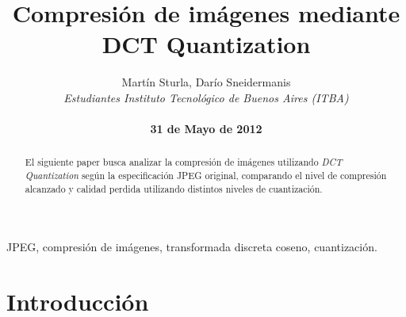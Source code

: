\documentclass[%
	final,
	reprint,
	notitlepage,
	narroweqnarray,
	inline,
	twoside,
	invited
	]{ieee}
\begin{document}
\title[Compresión de Imágenes]{%
Compresión de imágenes mediante \\DCT Quantization}

\author[Sturla, Sneidermanis]{Martín Sturla, Darío Sneidermanis\\\textit{Estudiantes 
       Instituto Tecnológico de Buenos Aires (ITBA)}\\
\\\textbf{31 de Mayo de 2012}
}



\lognumber{}
\pubitemident{}


\maketitle               

\begin{abstract} 
El siguiente paper busca analizar la compresión de imágenes utilizando \textit{DCT Quantization} según 
la especificación JPEG original, comparando el nivel de compresión alcanzado y calidad perdida 
utilizando distintos niveles de cuantización.
\end{abstract}

\begin{keywords}
JPEG, compresión de imágenes, transformada discreta coseno, cuantización.
\end{keywords}

\section{Introducción}
\end{document}
